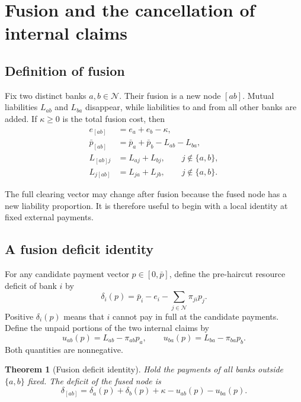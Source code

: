\documentclass[11pt]{article}
\newtheorem{theorem}{Theorem}[section]
\theoremstyle{definition}
\theoremstyle{remark}
\newcommand{\N}{\mathcal{N}}
\newcommand{\pbar}{\bar p}
\begin{document}
\section{Fusion and the cancellation of internal claims}

\subsection{Definition of fusion}

Fix two distinct banks $a,b\in\N$.  Their fusion is a new node $[ab]$.  Mutual
liabilities $L_{ab}$ and $L_{ba}$ disappear, while liabilities to and from all
other banks are added.  If $\kappa\geq0$ is the total fusion cost, then
\begin{align}
  e_{[ab]}&=e_a+e_b-\kappa,\\
  \pbar_{[ab]}&=\pbar_a+\pbar_b-L_{ab}-L_{ba},\\
  L_{[ab]j}&=L_{aj}+L_{bj},\qquad j\notin\{a,b\},\\
  L_{j[ab]}&=L_{ja}+L_{jb},\qquad j\notin\{a,b\}.
\end{align}

The full clearing vector may change after fusion because the fused node has a
new liability proportion.  It is therefore useful to begin with a local
identity at fixed external payments.

\subsection{A fusion deficit identity}

For any candidate payment vector $p\in[0,\pbar]$, define the pre-haircut
resource deficit of bank $i$ by
\begin{equation}
  \delta_i(p)=
  \pbar_i-e_i-\sum_{j\in\N}\pi_{ji}p_j.
\end{equation}
Positive $\delta_i(p)$ means that $i$ cannot pay in full at the candidate
payments.  Define the unpaid portions of the two internal claims by
\begin{equation}
  u_{ab}(p)=L_{ab}-\pi_{ab}p_a,
  \qquad
  u_{ba}(p)=L_{ba}-\pi_{ba}p_b.
\end{equation}
Both quantities are nonnegative.

\begin{theorem}[Fusion deficit identity]\label{thm:fusion-identity}
Hold the payments of all banks outside $\{a,b\}$ fixed.  The deficit of the
fused node is
\begin{equation}\label{eq:fusion-identity}
  \delta_{[ab]}
  =\delta_a(p)+\delta_b(p)+\kappa-u_{ab}(p)-u_{ba}(p).
\end{equation}
\end{theorem}
\end{document}
